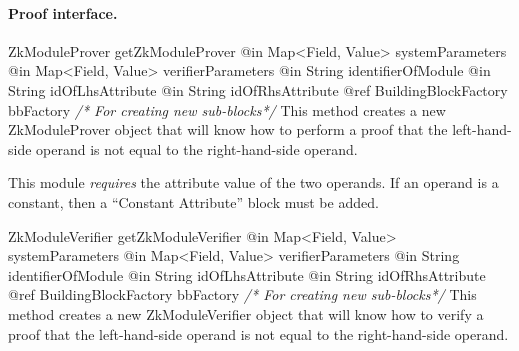     \paragraph{Proof interface.}
      \begin{method}
      {ZkModuleProver}
      {getZkModuleProver}
      {
        {@in Map<Field, Value> systemParameters}
        {@in Map<Field, Value> verifierParameters}
        {@in String identifierOfModule}
        {@in String idOfLhsAttribute}
        {@in String idOfRhsAttribute}
        {@ref BuildingBlockFactory bbFactory \textrm{\emph{/* For creating new sub-blocks*/}}}
      }
      This method creates a new ZkModuleProver object that will know how to
      perform a proof that the left-hand-side operand is not equal to the
      right-hand-side operand.

      This module \emph{requires} the attribute value of the two operands.
      If an operand is a constant, then a ``Constant Attribute'' block must be added.

      \end{method}
      \begin{method}
      {ZkModuleVerifier}
      {getZkModuleVerifier}
      {
        {@in Map<Field, Value> systemParameters}
        {@in Map<Field, Value> verifierParameters}
        {@in String identifierOfModule}
        {@in String idOfLhsAttribute}
        {@in String idOfRhsAttribute}
        {@ref BuildingBlockFactory bbFactory \textrm{\emph{/* For creating new sub-blocks*/}}}
      }
      This method creates a new ZkModuleVerifier object that will know how to
      verify a proof that the left-hand-side operand is not equal to the
      right-hand-side operand.
      \end{method}

